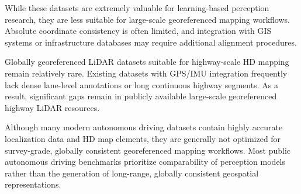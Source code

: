 While these datasets are extremely valuable for learning-based perception research, they are less suitable for large-scale georeferenced mapping workflows. Absolute coordinate consistency is often limited, and integration with GIS systems or infrastructure databases may require additional alignment procedures.

Globally georeferenced LiDAR datasets suitable for highway-scale HD mapping remain relatively rare. Existing datasets with GPS/IMU integration frequently lack dense lane-level annotations or long continuous highway segments. As a result, significant gaps remain in publicly available large-scale georeferenced highway LiDAR resources.

Although many modern autonomous driving datasets contain highly accurate localization data and HD map elements, they are generally not optimized for survey-grade, globally consistent georeferenced mapping workflows. Most public autonomous driving benchmarks prioritize comparability of perception models rather than the generation of long-range, globally consistent geospatial representations.